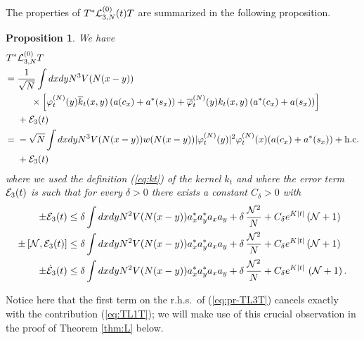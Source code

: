 \documentclass[11pt,a4paper]{article}
\newtheorem{proposition}[thm]{Proposition}
\newcommand{\ech}[2]{#2}	%
\newcommand{\ekt}{e^{K\lvert t\rvert}}	%
\newcommand{\cE}{{\cal E}}
\newcommand{\cL}{{\cal L}}
\newcommand{\cN}{{\cal N}}
\begin{document}
The properties of $T^* \cL_{3,N}^{(0)} (t) T$ are summarized in the following proposition. 
\begin{proposition}\label{prop:TL3T}
We have
\begin{equation}\label{eq:pr-TL3T} \begin{split} T^* &\cL^{(0)}_{3,N} T \\ =  \; & \frac{1}{\sqrt{N}} 
\int dx dy N^3 V (N (x-y))  \\ & \hspace{.5cm} \times \left[ \varphi_t^{(N)} (y) \overline{k}_t (x,y)  \left( a (c_x) + a^* (s_x) \right)   + \overline{\varphi}_t^{(N)} (y) k_t (x,y)  \left( a^* (c_x) + a (s_x) \right)  \right] \\ &+ \cE_3 (t) \\
= \; &- \sqrt{N} \int dx dy N^3 V(N (x-y)) w(N (x-y)) |\varphi_t^{(N)} (y)|^2 \varphi_t^{(N)} (x) (a (c_x) + a^* (s_x)) + \text{h.c.} \\ &+ \cE_3 (t)
\end{split} \end{equation}
where we used the definition (\ref{eq:kt}) of the kernel $k_t$ and where the error term $\cE_3 (t)$ is such that for every $\delta > 0$ there exists a constant $C_\delta > 0$ with
\begin{equation}\label{eq:TL3T-cl}
\begin{split} \pm \cE_3 (t)  &\leq \delta \int dx dy N^2 V (N (x-y)) a_x^* a_y^* a_x a_y + \delta \,\frac{\cN^2}{N} + C_\delta \ech{\| \varphi_t^{(N)} \|_{H^2}^2}{\ekt} \left(\cN + 1\right) \\
\pm \left[ \cN , \cE_3 (t) \right] &\leq \delta \int dx dy N^2 V (N (x-y)) a_x^* a_y^* a_x a_y + \delta \,  \frac{\cN^2}{N} + C_\delta  \ech{\| \varphi_t^{(N)} \|_{H^2}^2}{\ekt}  \left(\cN + 1\right) \\
\pm \dot{\cE}_3 (t) & \leq \delta \int dx dy N^2 V (N (x-y)) a_x^* a_y^* a_x a_y + \delta \, \frac{\cN^2}{N} 
\ech{\\ & \hspace{.5cm} + C_\delta \left( \| \varphi_t^{(N)} \|_{H^4}^2 \| \varphi_t^{(N)} \|_{H^2}^2 + \| \varphi_t^{(N)} \|_{H^2}^4 \right)}{+ C_\delta \ekt} \,  \left( \cN + 1\right).
\end{split} \end{equation}
\end{proposition}

Notice here that the first term on the r.h.s.\ of (\ref{eq:pr-TL3T}) cancels exactly with the contribution (\ref{eq:TL1T}); we will make use of this crucial observation in the proof of Theorem \ref{thm:L} below.
\end{document}
